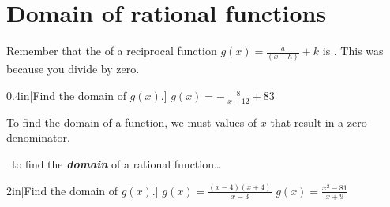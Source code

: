\section{Domain of rational functions}

Remember 
that the  of a reciprocal function $g(x) = \frac{a}{(x-h)} + k$ is .
This was because you  divide by zero.

\begin{myWideProblem}{0.4in}[Find the domain of $g(x)$.]
    {
        $g(x) = -\,\frac{8}{x-12} + 83$
    }
\end{myWideProblem}
\vspace{1em}



To find the domain of a  function, we must  values of $x$ that result in a zero denominator.

\begin{myConceptSteps}{~to find the {\bfseries\itshape domain} of a rational function\dots}
\end{myConceptSteps}

\begin{my2Problems}{2in}[Find the domain of $g(x)$.]
    {
        $g(x) = \frac{(x-4)(x+4)}{x-3}$
    }
    {
        $g(x) = \frac{x^2 - 81}{x+9}$
    }
\end{my2Problems}
